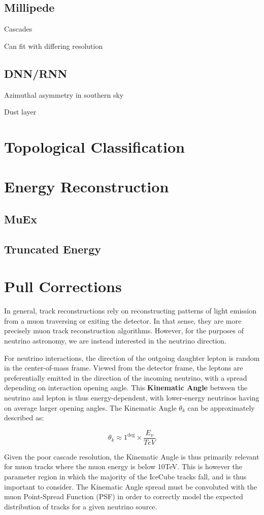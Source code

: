\subsection{Millipede}
Cascades

Can fit with differing resolution
\subsection{DNN/RNN}

 
Azimuthal asymmetry in southern sky

Dust layer
\section{Topological Classification}
\section{Energy Reconstruction}
\subsection{MuEx}
\subsection{Truncated Energy}
\section{Pull Corrections}
In general, track reconstructions rely on reconstructing patterns of light emission from a muon traversing or exiting the detector. In that sense, they are more precisely muon track reconstruction algorithms. However, for the purposes of neutrino astronomy, we are instead interested in the neutrino direction. 

For neutrino interactions, the direction of the outgoing daughter lepton is random in the center-of-mass frame. Viewed from the detector frame, the leptons are preferentially emitted in the direction of the incoming neutrino, with a spread depending on interaction opening angle. This \textbf{Kinematic Angle} between the neutrino and lepton is thus energy-dependent, with lower-energy neutrinos having on average larger opening angles. The Kinematic Angle $\theta_{k} $ can be approximately described as:

\[ \theta_{k} \approx 1 ^{\deg} \times \frac{E_{\nu}}{TeV} \]

Given the poor cascade resolution, the Kinematic Angle is thus primarily relevant for muon tracks where the muon energy is below 10TeV. This is however the parameter region in which the majority of the IceCube tracks fall, and is thus important to consider. The Kinematic Angle spread must be convoluted with the muon Point-Spread Function (PSF) in order to correctly model the expected distribution of tracks for a given neutrino source.

